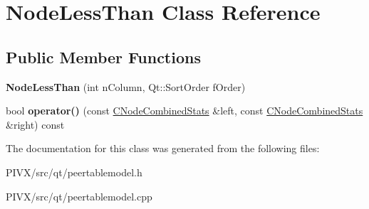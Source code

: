 \hypertarget{class_node_less_than}{}\section{Node\+Less\+Than Class Reference}
\label{class_node_less_than}
\subsection*{Public Member Functions}
\begin{DoxyCompactItemize}
\item 
\mbox{\label{class_node_less_than_ab9d2ef05545cba5acb3b3bc2ea9c859c}} 
{\bfseries Node\+Less\+Than} (int n\+Column, Qt\+::\+Sort\+Order f\+Order)
\item 
\mbox{\label{class_node_less_than_a001e114bc5defaaec4feb1be3c71a327}} 
bool {\bfseries operator()} (const \mbox{\hyperlink{struct_c_node_combined_stats}{C\+Node\+Combined\+Stats}} \&left, const \mbox{\hyperlink{struct_c_node_combined_stats}{C\+Node\+Combined\+Stats}} \&right) const
\end{DoxyCompactItemize}


The documentation for this class was generated from the following files\+:\begin{DoxyCompactItemize}
\item 
P\+I\+V\+X/src/qt/peertablemodel.\+h\item 
P\+I\+V\+X/src/qt/peertablemodel.\+cpp\end{DoxyCompactItemize}
